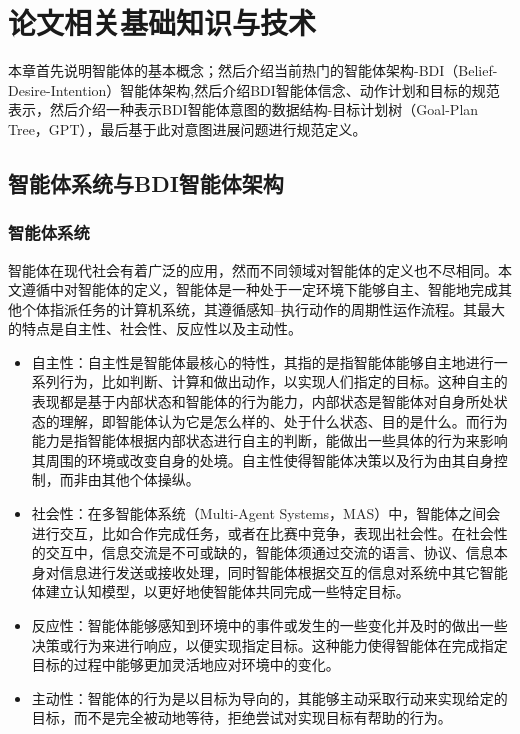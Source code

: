 \chapter{论文相关基础知识与技术}
本章首先说明智能体的基本概念；然后介绍当前热门的智能体架构-BDI（Belief-Desire-Intention）智能体架构,然后介绍BDI智能体信念、动作计划和目标的规范表示，然后介绍一种表示BDI智能体意图的数据结构-目标计划树（Goal-Plan Tree，GPT），最后基于此对意图进展问题进行规范定义。

\section{智能体系统与BDI智能体架构}\label{background}
\subsection{智能体系统}
智能体在现代社会有着广泛的应用，然而不同领域对智能体的定义也不尽相同。本文遵循\cite{DBLP:journals/ker/WooldridgeJ95}中对智能体的定义，智能体是一种处于一定环境下能够自主、智能地完成其他个体指派任务的计算机系统，其遵循感知--执行动作的周期性运作流程。其最大的特点是自主性、社会性、反应性以及主动性。
\begin{itemize}
  \item 自主性：自主性是智能体最核心的特性，其指的是指智能体能够自主地进行一系列行为，比如判断、计算和做出动作，以实现人们指定的目标。这种自主的表现都是基于内部状态和智能体的行为能力，内部状态是智能体对自身所处状态的理解，即智能体认为它是怎么样的、处于什么状态、目的是什么。而行为能力是指智能体根据内部状态进行自主的判断，能做出一些具体的行为来影响其周围的环境或改变自身的处境。自主性使得智能体决策以及行为由其自身控制，而非由其他个体操纵。
  \item 社会性：在多智能体系统（Multi-Agent Systems，MAS）中，智能体之间会进行交互，比如合作完成任务，或者在比赛中竞争，表现出社会性。在社会性的交互中，信息交流是不可或缺的，智能体须通过交流的语言、协议、信息本身对信息进行发送或接收处理，同时智能体根据交互的信息对系统中其它智能体建立认知模型，以更好地使智能体共同完成一些特定目标。
   \item 反应性：智能体能够感知到环境中的事件或发生的一些变化并及时的做出一些决策或行为来进行响应，以便实现指定目标。这种能力使得智能体在完成指定目标的过程中能够更加灵活地应对环境中的变化。
   \item 主动性：智能体的行为是以目标为导向的，其能够主动采取行动来实现给定的目标，而不是完全被动地等待，拒绝尝试对实现目标有帮助的行为。
\end{itemize}

